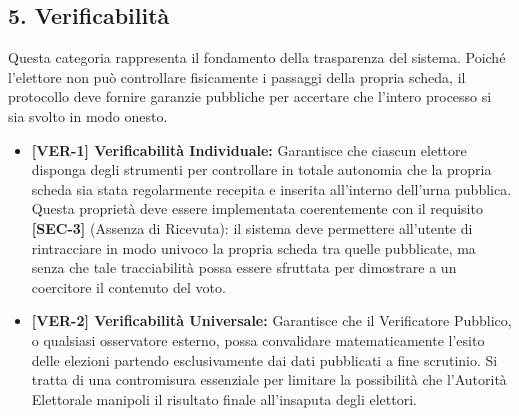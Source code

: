 \subsection*{5. Verificabilità}
Questa categoria rappresenta il fondamento della trasparenza del sistema. Poiché l'elettore non può controllare fisicamente i passaggi della propria scheda, il protocollo deve fornire garanzie pubbliche per accertare che l'intero processo si sia svolto in modo onesto.

\begin{itemize}
    \item \textbf{[VER-1] Verificabilità Individuale:} Garantisce che ciascun elettore disponga degli strumenti per controllare in totale autonomia che la propria scheda sia stata regolarmente recepita e inserita all'interno dell'urna pubblica. Questa proprietà deve essere implementata coerentemente con il requisito \textbf{[SEC-3]} (Assenza di Ricevuta): il sistema deve permettere all'utente di rintracciare in modo univoco la propria scheda tra quelle pubblicate, ma senza che tale tracciabilità possa essere sfruttata per dimostrare a un coercitore il contenuto del voto.
    \item \textbf{[VER-2] Verificabilità Universale:} Garantisce che il Verificatore Pubblico, o qualsiasi osservatore esterno, possa convalidare matematicamente l'esito delle elezioni partendo esclusivamente dai dati pubblicati a fine scrutinio. Si tratta di una contromisura essenziale per limitare la possibilità che l'Autorità Elettorale manipoli il risultato finale all'insaputa degli elettori.
\end{itemize}

